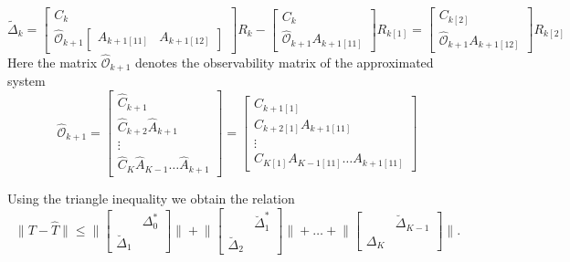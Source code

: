 \documentclass[numbers=noenddot,doctype=mastersthesis,BCOR=15mm,biblatex]{ldvbook}%
\newcommand{\Ob}{\mathcal{O}} %
\begin{document}
\begin{equation*}
\tilde{\Delta}_k=
	\begin{bmatrix}
	C_k\\
	\hat{\Ob}_{k+1}\begin{bmatrix}
	A_{k+1[11]}&A_{k+1[12]}
	\end{bmatrix}
	\end{bmatrix}
	R_k
	-
	\begin{bmatrix}
C_k\\
\hat{\Ob}_{k+1}
A_{k+1[11]}
\end{bmatrix}
R_{k[1]}
= 
\begin{bmatrix}
C_{k[2]}\\
\hat{\Ob}_{k+1}A_{k+1[12]}
\end{bmatrix}
R_{k[2]}
\end{equation*}
Here the matrix $\hat{\Ob}_{k+1}$ denotes the observability matrix of the approximated system 
\begin{equation}
\hat{\Ob}_{k+1}=
\begin{bmatrix}
\hat{C}_{k+1}\\
\hat{C}_{k+2}\hat{A}_{k+1}\\
\vdots \\
\hat{C}_{K} \hat{A}_{K-1} \dots \hat{A}_{k+1}
\end{bmatrix}
=
\begin{bmatrix}
C_{k+1[1]}\\
C_{k+2[1]}A_{k+1[11]}\\
\vdots\\
C_{K[1]}A_{K-1[11]}\dots A_{k+1[11]}
\end{bmatrix}
\end{equation}

Using the triangle inequality we obtain the relation
\begin{equation}
\|T-\hat{T}\| \leq
\Bigg\|
\begin{bmatrix}
&\Delta_0^*\\
\breve{\Delta}_1
\end{bmatrix}
\Bigg\|+\Bigg\|
\begin{bmatrix}
&\breve{\Delta}_1^*\\
\breve{\Delta}_2
\end{bmatrix}
\Bigg\|+\dots+\Bigg\|
\begin{bmatrix}
&\breve{\Delta}_{K-1}\\
\Delta_K
\end{bmatrix}
\Bigg\|.
\end{equation}
\end{document}
